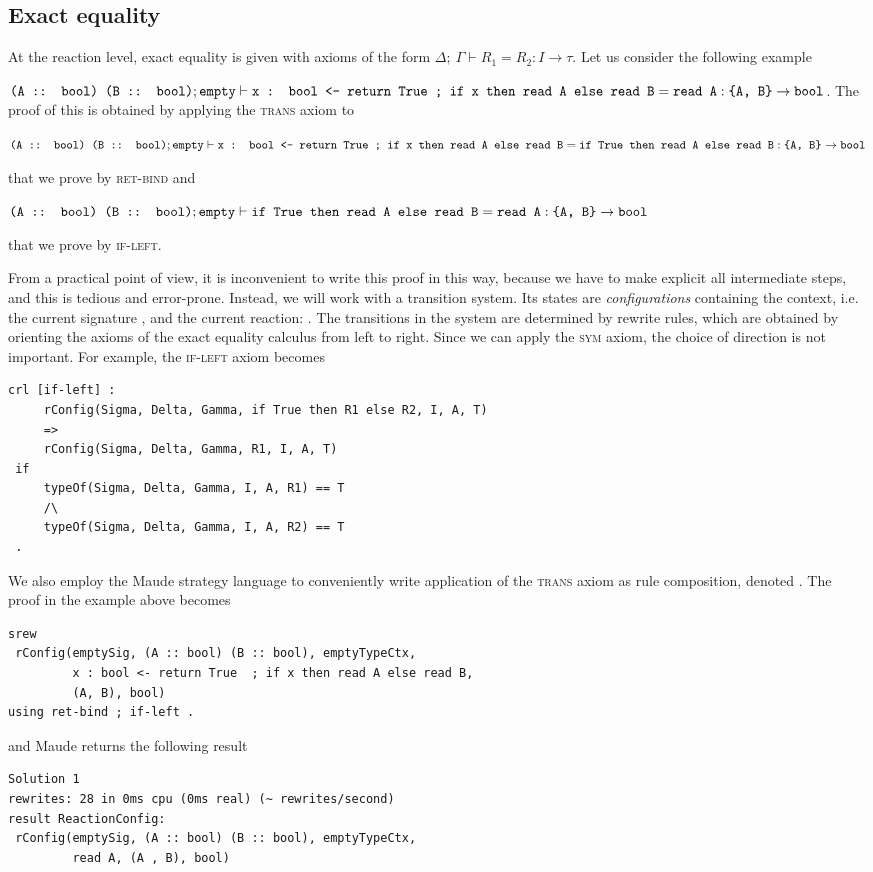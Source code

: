 \subsection{Exact equality}



At the reaction level, exact equality is given with axioms of the form
$\Delta; \ \Gamma \vdash R_1 = R_2 : I \to \tau$. 
Let us consider the following example

$\texttt{(A :: bool) (B :: bool)}; \texttt{empty} \vdash \texttt{x : bool <- return True  ; if x then read A else read B} = \texttt{read A} : \texttt{\{A, B\}} \to \texttt{bool}$. 
The proof of this is obtained by applying the \textsc{trans} axiom to

$\texttt{(A :: bool) (B :: bool)}; \texttt{empty} \vdash \texttt{x : bool <- return True  ; if x then read A else read B} = \texttt{if True then read A else read B} : \texttt{\{A, B\}} \to \texttt{bool}$

\noindent that we prove by \textsc{ret-bind} and

$\texttt{(A :: bool) (B :: bool)}; \texttt{empty} \vdash \texttt{if True then read A else read B} = \texttt{read A} : \texttt{\{A, B\}} \to \texttt{bool}$

\noindent that we prove by \textsc{if-left}. 

From a practical point of view, it is inconvenient to write this proof in this way, because we have to make explicit all intermediate steps, 
and this is tedious and error-prone. Instead, we will work with a
transition system. Its states are \emph{configurations} containing the context, i.e. the current signature ,
and the current reaction: .
The transitions in the system are determined by rewrite rules, 
which are obtained by orienting the axioms of the exact equality calculus
from left to right. Since we can apply the \textsc{sym} axiom,
the choice of direction is not important.
For example,
the \textsc{if-left} axiom becomes
\begin{lstlisting}
crl [if-left] : 
     rConfig(Sigma, Delta, Gamma, if True then R1 else R2, I, A, T) 
     =>  
     rConfig(Sigma, Delta, Gamma, R1, I, A, T)
 if
     typeOf(Sigma, Delta, Gamma, I, A, R1) == T
     /\
     typeOf(Sigma, Delta, Gamma, I, A, R2) == T 
 .
\end{lstlisting}

We also employ the Maude strategy language to conveniently write 
application of the \textsc{trans} axiom as rule composition, denoted \code{;}. The proof in the example above becomes
\begin{lstlisting}
srew 
 rConfig(emptySig, (A :: bool) (B :: bool), emptyTypeCtx, 
         x : bool <- return True  ; if x then read A else read B, 
         (A, B), bool)
using ret-bind ; if-left .
\end{lstlisting}
\noindent and Maude returns the following result
\begin{lstlisting}
Solution 1
rewrites: 28 in 0ms cpu (0ms real) (~ rewrites/second)
result ReactionConfig: 
 rConfig(emptySig, (A :: bool) (B :: bool), emptyTypeCtx, 
         read A, (A , B), bool)
\end{lstlisting}

